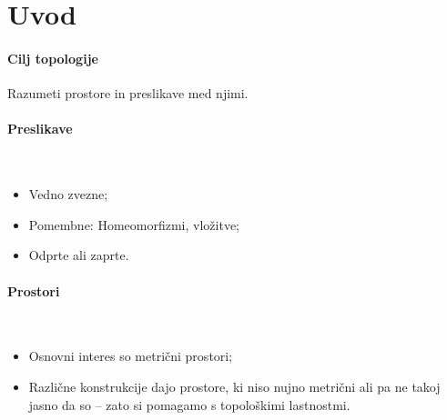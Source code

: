 \section*{Uvod}

\paragraph{Cilj topologije} Razumeti prostore in preslikave med njimi.

\paragraph{Preslikave} \ 
\begin{itemize}
    \item Vedno zvezne;
    \item Pomembne: Homeomorfizmi, vložitve;
    \item Odprte ali zaprte.
\end{itemize}

\paragraph{Prostori} \
\begin{itemize}
    \item Osnovni interes so metrični prostori;
    \item Različne konstrukcije dajo prostore, ki niso nujno metrični ali pa ne takoj jasno da so -- zato si pomagamo s topološkimi lastnostmi.
\end{itemize}


